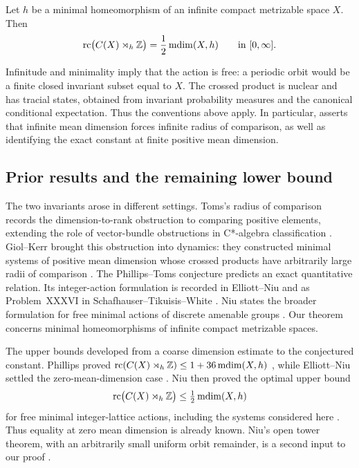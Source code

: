 \begin{theorem}
\label{thm:main}
Let \(h\) be a minimal homeomorphism of an infinite compact metrizable
space \(X\). Then
\begin{equation}
\label{eq:main}
\operatorname{rc}\bigl(C(X)\rtimes_h\mathbb Z\bigr)=\frac12\operatorname{mdim}(X,h)
\qquad\text{in }[0,\infty].
\end{equation}
\end{theorem}

Infinitude and minimality imply that the action is free: a periodic orbit
would be a finite closed invariant subset equal to \(X\).
The crossed product is nuclear \cite[Section~3]{ElliottNiu2017} and
has tracial states, obtained from invariant probability measures and
the canonical conditional expectation.
Thus the conventions above apply. In particular, 
asserts that infinite mean dimension forces infinite radius of
comparison, as well as identifying the exact constant at finite
positive mean dimension.

\subsection{Prior results and the remaining lower bound}

The two invariants arose in different settings. Toms's radius of
comparison records the dimension-to-rank obstruction to comparing
positive elements, extending the role of vector-bundle obstructions
in C*-algebra classification \cite[Section~6]{Toms2006}.
Giol--Kerr brought this obstruction into dynamics: they constructed
minimal systems of positive mean dimension whose crossed products have
arbitrarily large radii of comparison
\cite[Section~2 and Theorem~2.2]{GiolKerr2010}.
The Phillips--Toms conjecture predicts an exact quantitative relation.
Its integer-action formulation is recorded in Elliott--Niu
\cite[Introduction]{ElliottNiu2017} and as Problem~XXXVI in
Schafhauser--Tikuisis--White \cite{SchafhauserTikuisisWhite2026}.
Niu states the broader formulation for free minimal actions of discrete
amenable groups \cite[Introduction]{Niu2024}. Our theorem concerns
minimal homeomorphisms of infinite compact metrizable spaces.

The upper bounds developed from a coarse dimension estimate to the
conjectured constant. Phillips proved
$\operatorname{rc}(C(X)\rtimes_h\mathbb Z)\le1+36\operatorname{mdim}(X,h)$
\cite[Corollary~4.8]{Phillips2016}, while Elliott--Niu settled the
zero-mean-dimension case \cite[Theorem~4.7]{ElliottNiu2017}.
Niu then proved the optimal upper bound
\begin{equation}
\label{eq:known-upper-bound}
\operatorname{rc}\bigl(C(X)\rtimes_h\mathbb Z\bigr)\le\tfrac12\operatorname{mdim}(X,h)
\end{equation}
for free minimal integer-lattice actions, including the systems
considered here \cite[Theorem~5.6]{Niu2024}. Thus equality at zero
mean dimension is already known. Niu's open tower theorem, with an
arbitrarily small uniform orbit remainder, is a second input to our
proof \cite[Theorem~4.2]{Niu2024}.

